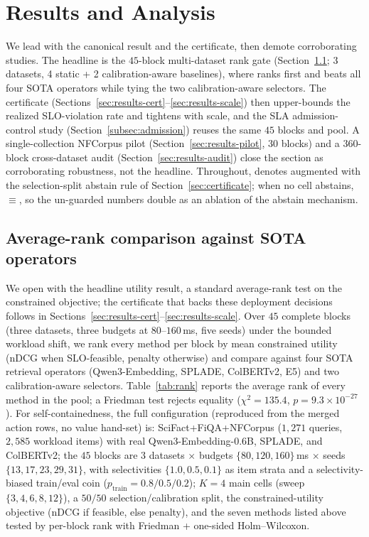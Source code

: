 \section{Results and Analysis}
\label{sec:results}

We lead with the canonical result and the certificate, then demote corroborating studies. The headline is the $45$-block multi-dataset rank gate (Section~\ref{sec:results-rank}; 3 datasets, 4 static + 2 calibration-aware baselines), where \CWC{} ranks first and beats all four SOTA operators while tying the two calibration-aware selectors. The certificate (Sections~\ref{sec:results-cert}--\ref{sec:results-scale}) then upper-bounds the realized SLO-violation rate and tightens with scale, and the SLA admission-control study (Section~\ref{subsec:admission}) reuses the same $45$ blocks and pool. A single-collection NFCorpus pilot (Section~\ref{sec:results-pilot}, $30$ blocks) and a $360$-block cross-dataset audit (Section~\ref{sec:results-audit}) close the section as corroborating robustness, not the headline. Throughout, \CWC{} denotes \WCR{} augmented with the selection-split abstain rule of Section~\ref{sec:certificate}; when no cell abstains, \CWC{}$\equiv$\WCR{}, so the un-guarded \WCR{} numbers double as an ablation of the abstain mechanism.

\subsection{Average-rank comparison against SOTA operators}
\label{sec:results-rank}

We open with the headline utility result, a standard average-rank test on the constrained objective; the certificate that backs these deployment decisions follows in Sections~\ref{sec:results-cert}--\ref{sec:results-scale}. Over $45$ complete blocks (three datasets, three budgets at $80$--$160$\,ms, five seeds) under the bounded workload shift, we rank every method per block by mean constrained utility (nDCG when SLO-feasible, penalty otherwise) and compare \CWC{} against four SOTA retrieval operators (Qwen3-Embedding, SPLADE, ColBERTv2, E5) and two calibration-aware selectors. Table~\ref{tab:rank} reports the average rank of every method in the pool; a Friedman test rejects equality ($\chi^2{=}135.4$, $p=9.3\times10^{-27}$). For self-containedness, the full configuration (reproduced from the merged action rows, no value hand-set) is: SciFact+FiQA+NFCorpus ($1{,}271$ queries, $2{,}585$ workload items) with real Qwen3-Embedding-0.6B, SPLADE, and ColBERTv2; the $45$ blocks are $3$ datasets $\times$ budgets $\{80,120,160\}$\,ms $\times$ seeds $\{13,17,23,29,31\}$, with selectivities $\{1.0,0.5,0.1\}$ as item strata and a selectivity-biased train/eval coin ($p_{\mathrm{train}}{=}0.8/0.5/0.2$); $K{=}4$ main cells (sweep $\{3,4,6,8,12\}$), a $50/50$ selection/calibration split, the constrained-utility objective (nDCG if feasible, else penalty), and the seven methods listed above tested by per-block rank with Friedman + one-sided Holm--Wilcoxon.

